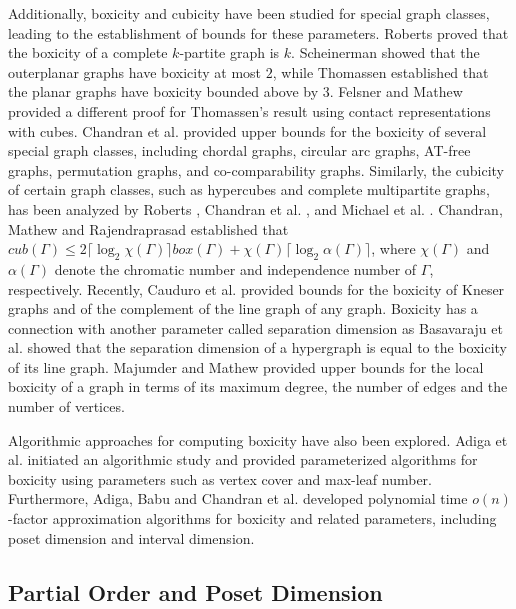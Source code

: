 \documentclass[twoside, 11pt]{article}
\newcommand{\G}{\Gamma}
\newcommand{\ceil}[1]{\lceil #1 \rceil}
\begin{document}
Additionally, boxicity and cubicity have been studied for special graph classes, leading to the establishment of bounds for these parameters. Roberts \cite{MR0252268} proved that the boxicity of a complete $k$-partite graph is $k$.  Scheinerman \cite{scheinerman1984intersection} showed that the outerplanar graphs have boxicity at most $2$, while Thomassen \cite{thomassen1986interval} established that the planar graphs have boxicity bounded above by $3$. Felsner and Mathew \cite{felsner2011contact} provided a different proof for Thomassen's result using contact representations with cubes. Chandran et al. \cite{chandran2007boxicity} provided upper bounds for the boxicity of several special graph classes, including chordal graphs, circular arc graphs, AT-free graphs, permutation graphs, and co-comparability graphs. Similarly, the cubicity of certain graph classes, such as hypercubes and complete multipartite graphs, has been analyzed by Roberts \cite{MR0252268}, Chandran et al. \cite{chandran2005cubicity, chandran2008cubicity}, and Michael et al. \cite{michael2006sphericity}. Chandran, Mathew and Rajendraprasad \cite{chandran2016upper} established that $cub(\G) \leq
2 \ceil{\log_2 \chi (\G)} box(\G) + \chi (\G) \ceil{\log_2 \alpha(\G)}$, where $\chi(\G)$ and $\alpha(\G)$ denote the chromatic number and independence number of $\G$, respectively. Recently, Cauduro et al. \cite{caoduro2023boxicity} provided bounds for the boxicity of Kneser graphs and of the complement of the line graph of any graph. Boxicity has a connection with another parameter called separation dimension \cite{ alon2015separation,basavaraju2016separation} as Basavaraju et al. \cite{basavaraju2016separation} showed that the separation dimension of a hypergraph is equal to the boxicity of its line graph. Majumder and Mathew \cite{majumder2022local} provided upper bounds for the local boxicity of a graph in terms of its maximum degree, the number of edges and the number of vertices.

Algorithmic approaches for computing boxicity have also been explored. Adiga et al. \cite{adiga2010parameterized} initiated an algorithmic study and provided parameterized algorithms for boxicity using parameters such as vertex cover and max-leaf number. Furthermore, Adiga, Babu and Chandran et al. \cite{adiga2018sublinear} developed polynomial time $o(n)$-factor approximation algorithms for boxicity and related parameters, including poset dimension and interval dimension.


\subsection{Partial Order and Poset Dimension}
\end{document}

